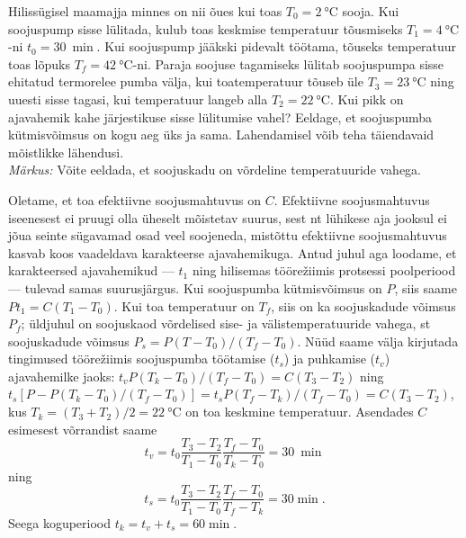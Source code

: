 
Hilissügisel maamajja minnes on nii õues kui toas $T_0=\SI {2}{\celsius}$ sooja. Kui soojuspump sisse lülitada, kulub toas keskmise temperatuur  tõusmiseks $T_1=\SI {4}{\celsius}$-ni $t_0=\SI{30}{\min}$. Kui soojuspump jääkski pidevalt töötama, tõuseks temperatuur toas lõpuks $T_f=\SI {42}{\celsius}$-ni. Paraja soojuse tagamiseks lülitab soojuspumpa sisse ehitatud termorelee pumba välja, kui toatemperatuur tõuseb üle $T_3=\SI{23}\celsius$ ning uuesti sisse tagasi, kui temperatuur langeb alla $T_2=\SI{22}{\celsius}$. Kui pikk on ajavahemik kahe järjestikuse sisse lülitumise vahel? Eeldage, et soojuspumba kütmisvõimsus on kogu aeg üks ja sama. Lahendamisel võib teha täiendavaid mõistlikke lähendusi.\\ \emph{Märkus:} Võite eeldada, et soojuskadu on võrdeline temperatuuride vahega.





\hint

\solu
Oletame, et toa efektiivne soojusmahtuvus on $C$. Efektiivne soojusmahtuvus iseenesest ei pruugi olla üheselt mõistetav suurus, sest nt lühikese aja jooksul ei jõua seinte sügavamad osad veel soojeneda, mistõttu efektiivne soojusmahtuvus kasvab koos vaadeldava karakteerse ajavahemikuga. Antud juhul aga loodame, et karakteersed ajavahemikud --- $t_1$ ning hilisemas töörežiimis protsessi poolperiood --- tulevad samas suurusjärgus. Kui soojuspumba kütmisvõimsus on $P$, siis saame $Pt_1=C(T_1-T_0)$. Kui toa temperatuur on $T_f$, siis on ka soojuskadude võimsus $P_f$; üldjuhul on soojuskaod võrdelised sise- ja välistemperatuuride vahega, st soojuskadude võimsus $P_s=P(T-T_0)/(T_f-T_0)$. Nüüd saame välja kirjutada tingimused töörežiimis soojuspumba töötamise ($t_s$) ja puhkamise ($t_v$) ajavahemilke jaoks: $t_vP(T_k-T_0)/(T_f-T_0)=C(T_3-T_2)$ ning $t_s[P-P(T_k-T_0)/(T_f-T_0)]=t_sP(T_f-T_k)/(T_f-T_0)=C(T_3-T_2)$, kus $T_k=(T_3+T_2)/2=\SI{22}\celsius$ on toa keskmine temperatuur. Asendades $C$ esimesest võrrandist saame $$t_v=t_0\frac{T_3-T_2}{T_1-T_0}\frac{T_f-T_0}{T_k-T_0}=\SI{30}{\min}$$ ning $$t_s=t_0\frac{T_3-T_2}{T_1-T_0}\frac{T_f-T_0}{T_f-T_k}=\SI{30}\min.$$ Seega koguperiood $t_k=t_v+t_s=\SI{60}\min$.
\probend